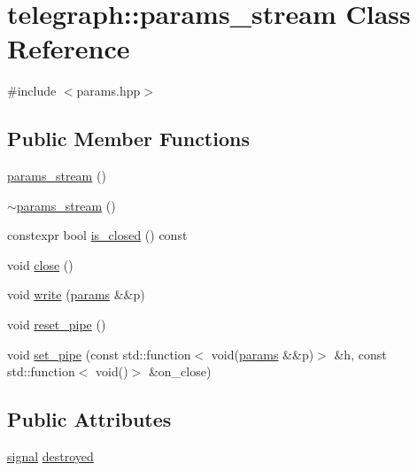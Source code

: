 \hypertarget{classtelegraph_1_1params__stream}{}\section{telegraph\+:\+:params\+\_\+stream Class Reference}
\label{classtelegraph_1_1params__stream}


{\ttfamily \#include $<$params.\+hpp$>$}

\subsection*{Public Member Functions}
\begin{DoxyCompactItemize}
\item 
\hyperlink{classtelegraph_1_1params__stream_af6dd3cea6f0a37463fd344f22bd93903}{params\+\_\+stream} ()
\item 
\hyperlink{classtelegraph_1_1params__stream_ad41ab836f33b2735749d9eaa89cc6f78}{$\sim$params\+\_\+stream} ()
\item 
constexpr bool \hyperlink{classtelegraph_1_1params__stream_a092b81bda513ee5bb082ebb8dd874bc1}{is\+\_\+closed} () const
\item 
void \hyperlink{classtelegraph_1_1params__stream_a7d22fd7b36c978a1ed1df2ba4d9972cb}{close} ()
\item 
void \hyperlink{classtelegraph_1_1params__stream_a64e27e3048892b53eecf3826505945b5}{write} (\hyperlink{classtelegraph_1_1params}{params} \&\&p)
\item 
void \hyperlink{classtelegraph_1_1params__stream_abc7d0b970cb2ed73d6d6a6be0a4ec85e}{reset\+\_\+pipe} ()
\item 
void \hyperlink{classtelegraph_1_1params__stream_a4860e9fd373d843ae4eac706f9fb8aaf}{set\+\_\+pipe} (const std\+::function$<$ void(\hyperlink{classtelegraph_1_1params}{params} \&\&p)$>$ \&h, const std\+::function$<$ void()$>$ \&on\+\_\+close)
\end{DoxyCompactItemize}
\subsection*{Public Attributes}
\begin{DoxyCompactItemize}
\item 
\hyperlink{classtelegraph_1_1signal}{signal} \hyperlink{classtelegraph_1_1params__stream_a248d6dacec53ba9f8c20ec04aaa299d0}{destroyed}
\end{DoxyCompactItemize}


